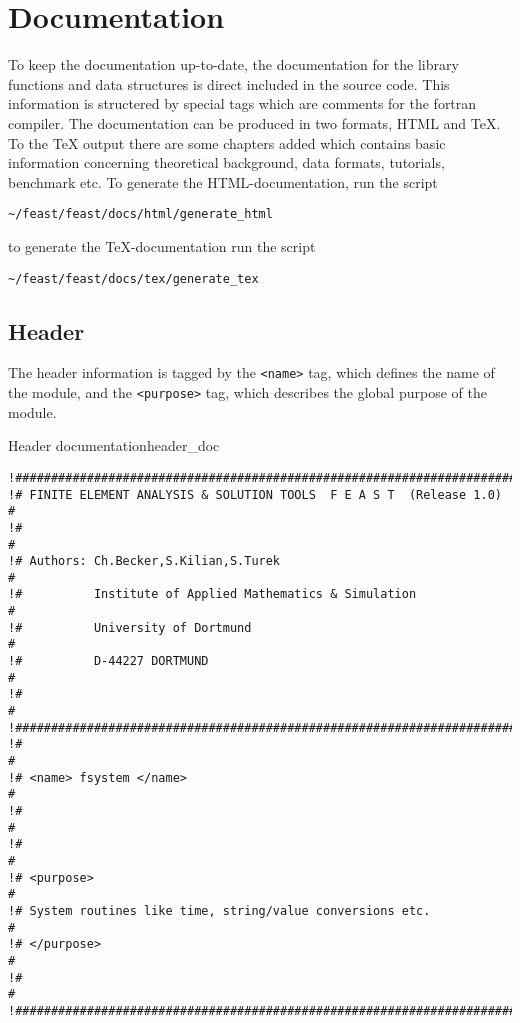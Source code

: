 \section{Documentation}

To keep the documentation up-to-date, the documentation for the
library functions and data structures is direct included in the source
code. This information is structered by special tags which are comments
for the fortran compiler. The documentation can be produced in two
formats, HTML and TeX. To the TeX output there are some chapters added
which contains basic information concerning theoretical background, data
formats, tutorials, benchmark etc. To generate the HTML-documentation,
run the script

\verb+~/feast/feast/docs/html/generate_html+

to generate the TeX-documentation run the script

\verb+~/feast/feast/docs/tex/generate_tex+


\subsection{Header}

The header information is tagged by the \verb+<name>+ tag, which defines
the name of the module, and the \verb+<purpose>+ tag, which describes the
global purpose of the module.

\begin{code}{Header documentation}{header_doc}
\begin{verbatim}
!########################################################################
!# FINITE ELEMENT ANALYSIS & SOLUTION TOOLS  F E A S T  (Release 1.0)   #
!#                                                                      #
!# Authors: Ch.Becker,S.Kilian,S.Turek                                  #
!#          Institute of Applied Mathematics & Simulation               #
!#          University of Dortmund                                      #
!#          D-44227 DORTMUND                                            #
!#                                                                      #
!########################################################################
!#                                                                      #
!# <name> fsystem </name>                                               #
!#                                                                      #
!#                                                                      #
!# <purpose>                                                            #
!# System routines like time, string/value conversions etc.             #
!# </purpose>                                                           #
!#                                                                      #
!########################################################################
\end{verbatim}
\end{code}

